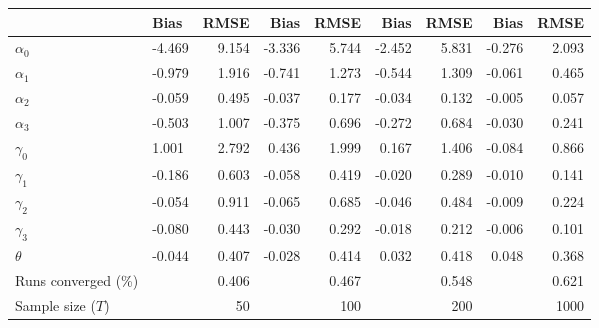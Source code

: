 
\begin{tabular}[t]{llrrrrrrr}
\toprule
  & Bias & RMSE & Bias & RMSE & Bias & RMSE & Bias & RMSE\\
\midrule
$\alpha_{0}$ & -4.469 & 9.154 & -3.336 & 5.744 & -2.452 & 5.831 & -0.276 & 2.093\\
$\alpha_{1}$ & -0.979 & 1.916 & -0.741 & 1.273 & -0.544 & 1.309 & -0.061 & 0.465\\
$\alpha_{2}$ & -0.059 & 0.495 & -0.037 & 0.177 & -0.034 & 0.132 & -0.005 & 0.057\\
$\alpha_{3}$ & -0.503 & 1.007 & -0.375 & 0.696 & -0.272 & 0.684 & -0.030 & 0.241\\
$\gamma_{0}$ & 1.001 & 2.792 & 0.436 & 1.999 & 0.167 & 1.406 & -0.084 & 0.866\\
$\gamma_{1}$ & -0.186 & 0.603 & -0.058 & 0.419 & -0.020 & 0.289 & -0.010 & 0.141\\
$\gamma_{2}$ & -0.054 & 0.911 & -0.065 & 0.685 & -0.046 & 0.484 & -0.009 & 0.224\\
$\gamma_{3}$ & -0.080 & 0.443 & -0.030 & 0.292 & -0.018 & 0.212 & -0.006 & 0.101\\
$\theta$ & -0.044 & 0.407 & -0.028 & 0.414 & 0.032 & 0.418 & 0.048 & 0.368\\
Runs converged (\%) &  & 0.406 &  & 0.467 &  & 0.548 &  & 0.621\\
Sample size ($T$) &  & 50 &  & 100 &  & 200 &  & 1000\\
\bottomrule
\end{tabular}

